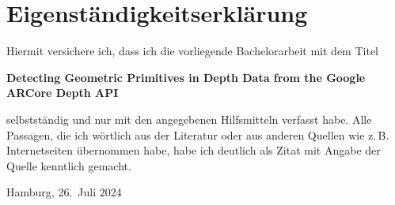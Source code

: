 
\printbibliography[category=inbib]


\appendix

%
%

\clearpage

\thispagestyle{empty}

\section*{Eigenständigkeitserklärung}

Hiermit versichere ich, dass ich die vorliegende Bachelorarbeit mit dem Titel
\begin{center}
    \textbf{
        Detecting Geometric Primitives
        in Depth Data from the
        Google ARCore Depth API
    }
\end{center}
selbstständig und nur mit den angegebenen Hilfsmitteln verfasst habe. Alle
Passagen, die ich wörtlich aus der Literatur oder aus anderen Quellen wie
z.\,B. Internetseiten übernommen habe, habe ich deutlich als Zitat mit Angabe
der Quelle kenntlich gemacht.

%
\vspace{2cm}
%

Hamburg, 26.\ Juli 2024
